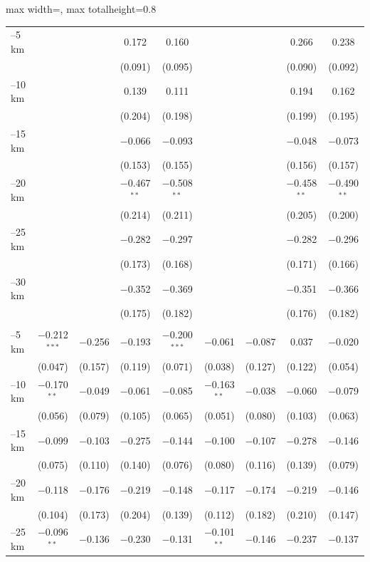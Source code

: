 \documentclass[11pt]{article}
\begin{document}
\begin{table}[H]
\begin{adjustbox}{max width=\textwidth, max totalheight=0.8\textheight}
\begin{tabular}{lcccccccc}
\quad 0--5 km &  &  & 0.172 & 0.160 &  &  & 0.266 & 0.238 \\
 &  &  & (0.091) & (0.095) &  &  & (0.090) & (0.092) \\
\quad 5--10 km &  &  & 0.139 & 0.111 &  &  & 0.194 & 0.162 \\
 &  &  & (0.204) & (0.198) &  &  & (0.199) & (0.195) \\
\quad 10--15 km &  &  & $-$0.066 & $-$0.093 &  &  & $-$0.048 & $-$0.073 \\
 &  &  & (0.153) & (0.155) &  &  & (0.156) & (0.157) \\
\quad 15--20 km &  &  & $-$0.467$^{**}$ & $-$0.508$^{**}$ &  &  & $-$0.458$^{**}$ & $-$0.490$^{**}$ \\
 &  &  & (0.214) & (0.211) &  &  & (0.205) & (0.200) \\
\quad 20--25 km &  &  & $-$0.282 & $-$0.297 &  &  & $-$0.282 & $-$0.296 \\
 &  &  & (0.173) & (0.168) &  &  & (0.171) & (0.166) \\
\quad 25--30 km &  &  & $-$0.352 & $-$0.369 &  &  & $-$0.351 & $-$0.366 \\
 &  &  & (0.175) & (0.182) &  &  & (0.176) & (0.182) \\
\addlinespace
\multicolumn{9}{l}{\textit{Catchment: Nyungwe}} \\
\quad 0--5 km & $-$0.212$^{***}$ & $-$0.256 & $-$0.193 & $-$0.200$^{***}$ & $-$0.061 & $-$0.087 & 0.037 & $-$0.020 \\
 & (0.047) & (0.157) & (0.119) & (0.071) & (0.038) & (0.127) & (0.122) & (0.054) \\
\quad 5--10 km & $-$0.170$^{**}$ & $-$0.049 & $-$0.061 & $-$0.085 & $-$0.163$^{**}$ & $-$0.038 & $-$0.060 & $-$0.079 \\
 & (0.056) & (0.079) & (0.105) & (0.065) & (0.051) & (0.080) & (0.103) & (0.063) \\
\quad 10--15 km & $-$0.099 & $-$0.103 & $-$0.275 & $-$0.144 & $-$0.100 & $-$0.107 & $-$0.278 & $-$0.146 \\
 & (0.075) & (0.110) & (0.140) & (0.076) & (0.080) & (0.116) & (0.139) & (0.079) \\
\quad 15--20 km & $-$0.118 & $-$0.176 & $-$0.219 & $-$0.148 & $-$0.117 & $-$0.174 & $-$0.219 & $-$0.146 \\
 & (0.104) & (0.173) & (0.204) & (0.139) & (0.112) & (0.182) & (0.210) & (0.147) \\
\quad 20--25 km & $-$0.096$^{**}$ & $-$0.136 & $-$0.230 & $-$0.131 & $-$0.101$^{**}$ & $-$0.146 & $-$0.237 & $-$0.137 \\

\end{tabular}
\end{adjustbox}
\end{table}
\end{document}
